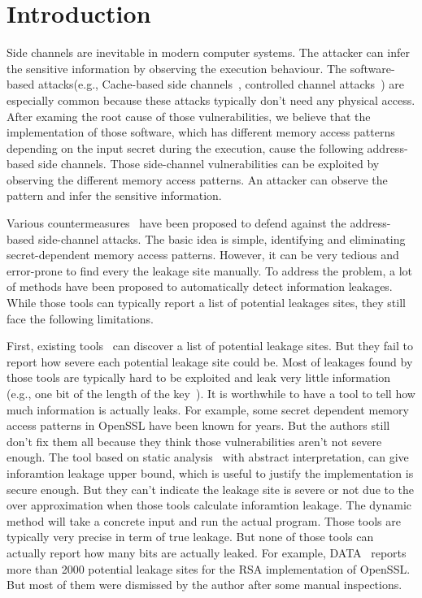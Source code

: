\section{Introduction}

Side channels are inevitable in modern computer systems. The attacker can infer the sensitive 
information by observing the execution behaviour. The software-based attacks(e.g., Cache-based 
side channels~\cite{184415,191010,7163050,Osvik:2006:CAC:2117739.2117741}, 
controlled channel attacks~\cite{7163052}) 
are especially common because these attacks typically don't need any physical access. 
After examing the root cause of those vulnerabilities, we believe that the implementation 
of those software, which has different memory access patterns depending on the input secret 
during the execution, cause the following address-based side channels. Those side-channel
vulnerabilities can be exploited by observing the different memory access patterns. An
attacker can observe the pattern and infer the sensitive information.

Various countermeasures~\cite{182946,203878,217537} have been proposed to defend against the 
address-based side-channel attacks. The basic idea is simple, identifying 
and eliminating secret-dependent memory access patterns. 
However, it can be very tedious and error-prone to find every the leakage site manually. 
To address the problem, a lot of methods have been proposed to automatically detect information leakages. 
While those tools can typically report a list of potential leakages sites, they still 
face the following limitations.

First, existing tools~\cite{203878, 217537} can discover a list of potential leakage sites. 
But they fail to report how severe each potential leakage site could be. Most of leakages 
found by those tools are typically hard to be exploited and leak very little information 
(e.g., one bit of the length of the key~\cite{203878}).  
It is worthwhile to have a tool to tell how much information is actually leaks. 
For example, some secret dependent memory access patterns in OpenSSL have been known 
for years. But the authors still don't fix them all because they think 
those vulnerabilities aren’t not severe enough. The tool based on static analysis~\cite{182946} with 
abstract interpretation, can give inforamtion leakage upper bound, which is useful to 
justify the implementation is secure enough. But they can’t indicate the leakage site 
is severe or not due to the over approximation when those tools calculate inforamtion leakage. 
The dynamic method will take a concrete input and run the actual program. 
Those tools are typically very precise in term of true leakage. But none of those tools 
can actually report how many bits are actually leaked. For example, DATA~\cite{217537} reports more 
than 2000 potential leakage sites for the RSA implementation of OpenSSL. But most of 
them were dismissed by the author after some manual inspections.

